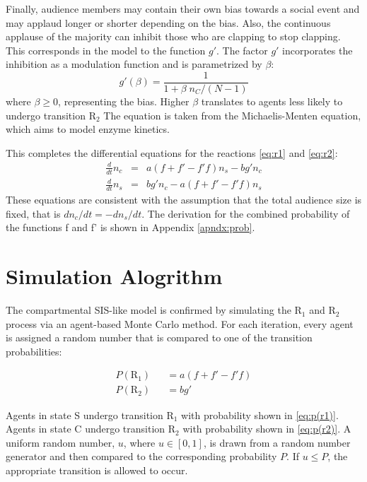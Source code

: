 Finally, audience members may contain their own bias towards a social event and may applaud longer or shorter depending on the bias.
Also, the continuous applause of the majority can inhibit those who are clapping to stop clapping.
This corresponds in the model to the function $g'$.
The factor $g'$ incorporates the inhibition as a modulation function and is parametrized by $\beta$: 
\begin{equation}\label{eq:g'}
  g'(\beta) = \frac{1}{1 + \beta\;n_C /(N-1)}
\end{equation}
where $\beta \geq 0$, representing the bias.
Higher $\beta$ translates to agents less likely to undergo transition $\mathrm{R}_{2}$ 
The equation is taken from the Michaelis-Menten equation, which aims to model enzyme kinetics\cite{michaelisconstant}.

This completes the differential equations for the reactions \eqref{eq:r1} and \eqref{eq:r2}:
\begin{eqnarray}
\frac{d}{dt}n_{c} &=& a (f+f'-f'f) n_{s} - b g' n_{c}\label{eq:diff1} \\
\frac{d}{dt}n_{s} &=& b g' n_{c} - a (f+f'-f'f) n_{s}\label{eq:diff2}
\end{eqnarray}
These equations are consistent with the assumption that the total audience size is fixed, that is $dn_{c}/dt = -dn_{s}/dt$.
The derivation for the combined probability of the functions f and f' is shown in Appendix \ref{apndx:prob}.



\section{Simulation Alogrithm}
\hspace{\parindent} The compartmental SIS-like model is confirmed by simulating the $\mathrm{R}_{1}$ and $\mathrm{R}_{2}$ process via an agent-based Monte Carlo method. For each iteration, every agent is assigned a random number that is compared to one of the transition probabilities:

\begin{eqnarray}
P(\mathrm{R}_{1}) &&= a(f + f' - f'f) \label{eq:p(r1)} \\
P(\mathrm{R}_{2}) &&= bg' \label{eq:p(r2)}
\end{eqnarray}

Agents in state S undergo transition $\mathrm{R}_{1}$ with probability shown in \ref{eq:p(r1)}.
Agents in state C undergo transition $\mathrm{R}_{2}$ with probability shown in \ref{eq:p(r2)}.
A uniform random number, $u$, where $u \in [0,1]$, is drawn from a random number generator and then compared to the corresponding probability $P$.
If $u \leq P$, the appropriate transition is allowed to occur.

